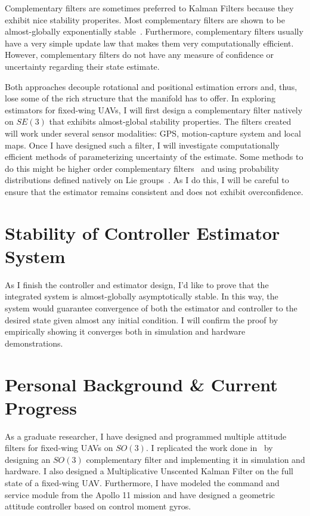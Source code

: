 \documentclass[letterpaper, 10 pt, conference]{ieeeconf}  %
\begin{document}
Complementary filters are sometimes preferred to Kalman Filters because they exhibit nice stability properites. Most complementary filters are shown to be almost-globally exponentially stable~\cite{Lageman2010Gradient}. Furthermore, complementary filters usually have a very simple update law that makes them very computationally efficient. However, complementary filters do not have any measure of confidence or uncertainty regarding their state estimate.

Both approaches decouple rotational and positional estimation errors and, thus, lose some of the rich structure that the manifold has to offer. In exploring estimators for fixed-wing UAVs, I will first design a complementary filter natively on $SE(3)$ that exhibits almost-global stability properties. The filters created will work under several sensor modalities: GPS, motion-capture system and local maps. Once I have designed such a filter, I will investigate computationally efficient methods of parameterizing uncertainty of the estimate. Some methods to do this might be higher order complementary filters~\cite{Zlotnik2018Higher} and using probability distributions defined natively on Lie groups~\cite{Applebaum2014Probability}. As I do this, I will be careful to ensure that the estimator remains consistent and does not exhibit overconfidence. 

\section{Stability of Controller Estimator System}
As I finish the controller and estimator design, I'd like to prove that the integrated system is almost-globally asymptotically stable. In this way, the system would guarantee convergence of both the estimator and controller to the desired state given almost any initial condition. I will confirm the proof by empirically showing it converges both in simulation and hardware demonstrations.

\section{Personal Background \& Current Progress}
As a graduate researcher, I have designed and programmed multiple attitude filters for fixed-wing UAVs on $SO(3)$. I replicated the work done in~\cite{Euston2008Complementary} by designing an $SO(3)$ complementary filter and implementing it in simulation and hardware. I also designed a Multiplicative Unscented Kalman Filter on the full state of a fixed-wing UAV. Furthermore, I have modeled the command and service module from the Apollo 11 mission and have designed a geometric attitude controller based on control moment gyros.
\end{document}
